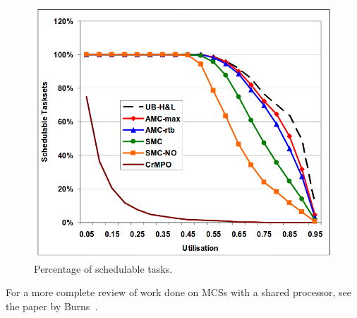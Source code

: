 
\begin{figure}[H]
\centering
\includegraphics[width=\textwidth]{./img/literature_schedulers.png}
\caption{Percentage of schedulable tasks.~\cite{baruah2011}}\label{fig:schedulers}
\end{figure}

For a more complete review of work done on MCSs with a shared processor, see the paper by Burns~\cite{burns2016}.


